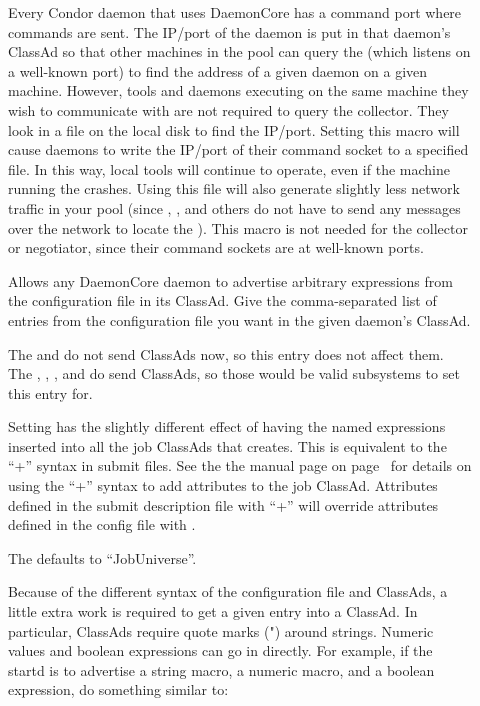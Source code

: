 \begin{description}
\item[]
  \label{param:SubsysAddressFile} Every Condor daemon that uses
  DaemonCore has a command port where commands are sent.  The
  IP/port of the daemon is put in that daemon's ClassAd so that other
  machines in the pool can query the  (which listens
  on a well-known port) to find the address of a given daemon on a
  given machine.  However, tools and daemons executing on the same
  machine they wish to communicate with are not required to query the
  collector. They look in a file on the local disk to find
  the IP/port.  Setting this macro will cause daemons to write the
  IP/port of their command socket to a specified file.  In this way,
  local tools will continue to operate, even if the machine running
  the  crashes.  Using this file will also generate
  slightly less network traffic in your pool (since ,
  , and others do not have to send any messages over the network to
  locate the ).  This macro is not needed
  for the collector or negotiator, since their command sockets are at
  well-known ports.  
  
\item[] \label{param:SubsysExprs}
  Allows any DaemonCore daemon to advertise arbitrary
  expressions from the configuration file in its ClassAd.  Give the
  comma-separated list of entries from the configuration file you want in the
  given daemon's ClassAd.
  
  \Note The  and  do not send
  ClassAds now, so this entry does not affect them.  The
  , , , and
   do send ClassAds, so those would be valid
  subsystems to set this entry for.
  
  Setting  has the slightly
  different effect of having the named expressions inserted into all
  the job ClassAds that  creates.  This is equivalent
  to the ``+'' syntax in submit files.  See the
  the  manual page
  on page~\pageref{sec:man-condor-submit} for details on using the ``+''
  syntax to add attributes to the job ClassAd.
  Attributes defined in the submit description file with ``+'' will
  override attributes defined in the config file with
  . 

  The   defaults to
  ``JobUniverse''.

  Because of the different syntax of the configuration
  file and ClassAds, a little extra work is required to get a
  given entry into a ClassAd.  In particular, ClassAds require quote
  marks (") around strings.  Numeric values and boolean expressions
  can go in directly.  
  For example, if the startd is to advertise a string macro, a numeric
  macro, and a boolean expression, do something similar to:


\end{description}
